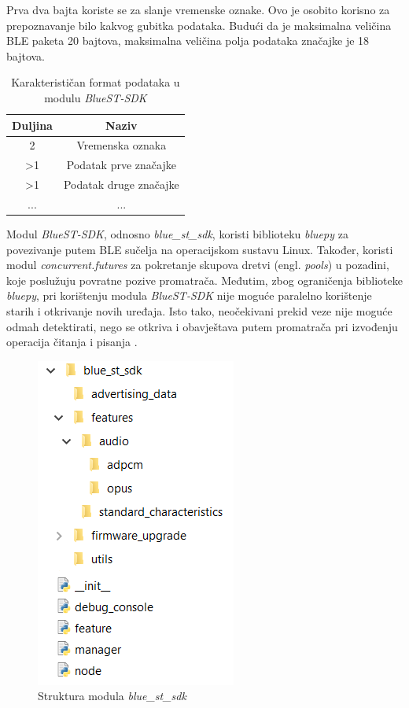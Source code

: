 Prva dva bajta koriste se za slanje vremenske oznake. Ovo je osobito korisno za prepoznavanje bilo kakvog gubitka podataka. Budući da je maksimalna veličina BLE paketa 20 bajtova, maksimalna veličina polja podataka značajke je 18 bajtova.

\begin{table}[ht!]
	\centering
	\caption{Karakterističan format podataka u modulu \textit{BlueST-SDK} \cite{bluest}}
	\begin{tabular}{|c| c|}
		\hline
		\rowcolor{lightblue}  
		\textbf{Duljina} & \textbf{Naziv}  \\ \hline
		2 &  Vremenska oznaka \\ \hline
		>1 & Podatak prve značajke \\ \hline
		>1 & Podatak druge značajke \\ \hline
		... & ... \\ \hline
	\end{tabular}
	\label{table:data_format}
\end{table}

Modul \textit{BlueST-SDK}, odnosno \textit{blue\_st\_sdk}, koristi biblioteku \textit{bluepy} za povezivanje putem BLE sučelja na operacijskom sustavu Linux. Također, koristi modul \textit{concurrent.futures} za pokretanje skupova dretvi (engl. \textit{pools}) u pozadini, koje poslužuju povratne pozive promatrača. Međutim, zbog ograničenja biblioteke \textit{bluepy}, pri korištenju modula \textit{BlueST-SDK} nije moguće paralelno korištenje starih i otkrivanje novih uređaja. Isto tako, neočekivani prekid veze nije moguće odmah detektirati, nego se otkriva i obavještava putem promatrača pri izvođenju operacija čitanja i pisanja \cite{bluest_py}. 

\begin{figure}[ht]
	\centering
	\includegraphics[scale=0.8]{imgs/sdk_folder_struct}
	\caption{Struktura modula \textit{blue\_st\_sdk}}
	\label{fig:sdk_folder_struct}
\end{figure}

